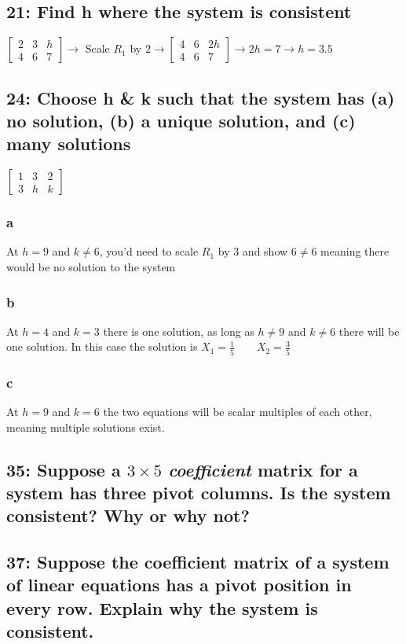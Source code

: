 \documentclass{article}
\begin{document}
\subsection*{21: Find h where the system is consistent}
$\left[\begin{array}{cc|c}
    2 & 3 & h \\
    4 & 6 & 7 
\end{array}\right] \rightarrow$ Scale $R_1$ by $2 \rightarrow
\left[\begin{array}{cc|c}
    4 & 6 & 2h \\
    4 & 6 & 7 
\end{array}\right] \rightarrow 2h=7 \rightarrow \boxed{h=3.5}
$
\subsection*{24: Choose h \& k such that the system has (a) no solution, (b) a unique solution, and (c) many solutions}
$\left[\begin{array}{cc|c}
    1 & 3 & 2 \\
    3 & h & k 
\end{array}\right]$
\subsubsection*{a}
At $h=9$ and $k\neq 6$, you'd need to scale $R_1$ by 3 and show $6\neq 6$ meaning there would be no solution to the system
\subsubsection*{b}
At $h=4$ and $k=3$ there is one solution, as long as $h \neq 9$ and $k \neq 6$ there will be one solution. In this case the solution is $X_1=\frac{1}{5} \qquad X_2 = \frac{3}{5}$
\subsubsection*{c}
At $h=9$ and $k=6$ the two equations will be scalar multiples of each other, meaning multiple solutions exist.
\subsection*{35: Suppose a $3\times 5$ \textit{coeﬃcient} matrix for a system has three pivot columns. Is the system consistent? Why or why not?}
\subsection*{37: Suppose the coeﬃcient matrix of a system of linear equations has a pivot position in every row. Explain why the system is consistent.}
\end{document}
